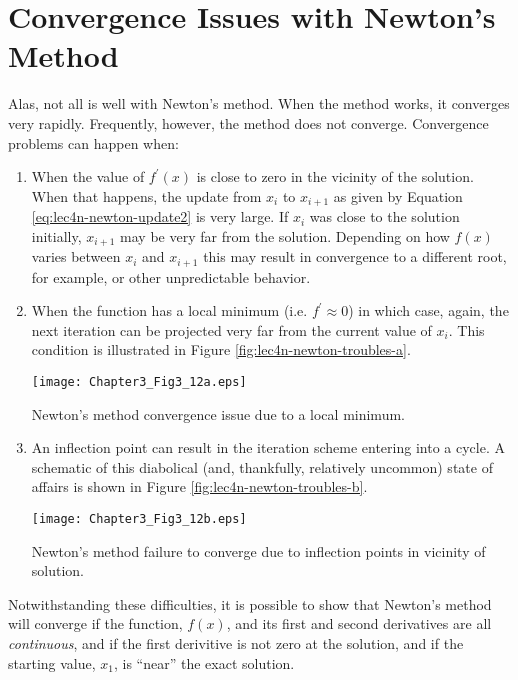 \section{Convergence Issues with Newton's Method}
Alas, not all is well with Newton's method.  When the method works, it converges very rapidly.  Frequently, however, the method does not converge.  Convergence problems can happen when:
\begin{enumerate}
\item When the value of $f^{\prime}(x)$ is close to zero in the vicinity of the solution.  When that happens, the update from $x_i$ to $x_{i+1}$ as given by Equation \ref{eq:lec4n-newton-update2} is very large.  If $x_i$ was close to the solution initially, $x_{i+1}$ may be very far from the solution.  Depending on how $f(x)$ varies between $x_i$ and $x_{i+1}$ this may result in convergence to a different root, for example, or other unpredictable behavior.

\item When the function has a local minimum (i.e. $f^{\prime} \approx 0$) in which case, again, the next iteration can be projected very far from the current value of $x_i$.  This condition is illustrated in Figure \ref{fig:lec4n-newton-troubles-a}.
\begin{marginfigure}
\texttt{[image: Chapter3\_Fig3\_12a.eps]}
\caption{Newton's method convergence issue due to a local minimum.}
\label{fig:lec4n-newton-troubles-a}
\end{marginfigure}

\item An inflection point can result in the iteration scheme entering into a cycle.  A schematic of this diabolical (and, thankfully, relatively uncommon) state of affairs is shown in Figure \ref{fig:lec4n-newton-troubles-b}.

\begin{marginfigure}
\texttt{[image: Chapter3\_Fig3\_12b.eps]}
\caption{Newton's method failure to converge due to inflection points in vicinity of solution.}
\label{fig:lec4n-newton-troubles-b}
\end{marginfigure}


\end{enumerate}
Notwithstanding these difficulties, it is possible to show that Newton's method will converge if the function, $f(x)$, and its first and second derivatives are all \emph{continuous}, and if the first derivitive is not zero at the solution, and if the starting value, $x_1$, is ``near'' the exact solution.

